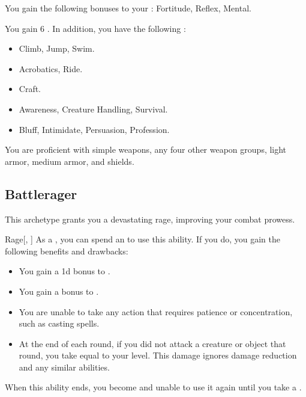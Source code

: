         You gain the following bonuses to your :  Fortitude,  Reflex,  Mental.

        You gain 6 .
        In addition, you have the following :
        \begin{itemize}
            \item {} Climb, Jump, Swim.
            \item {} Acrobatics, Ride.
            \item {} Craft.
            \item {} Awareness, Creature Handling, Survival.
            \item {} Bluff, Intimidate, Persuasion, Profession.
        \end{itemize}

        You are proficient with simple weapons, any four other weapon groups, light armor, medium armor, and shields.

    \subsection{Battlerager}\label{Rage}
        This archetype grants you a devastating rage, improving your combat prowess.

        \begin{ability}{Rage}[, ]
            As a , you can spend an  to use this ability.
            If you do, you gain the following benefits and drawbacks:
            \begin{itemize}
                \item You gain a \plus1d bonus to .
                \item You gain a  bonus to .
                \item You are unable to take any action that requires patience or concentration, such as casting spells.
                \item At the end of each round, if you did not attack a creature or object that round, you take  equal to your level.
                    This damage ignores damage reduction and any similar abilities.
            \end{itemize}
            When this ability ends, you become \fatigued and unable to use it again until you take a .
        \end{ability}

